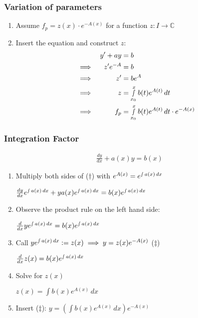 \documentclass[a4paper, 10pt]{article}
\theoremstyle{definition}
\theoremstyle{colored}
\theoremstyle{ex}
\theoremstyle{named}
\newcommand{\C}{\mathbb{C}}
\begin{document}
\subsubsection*{Variation of parameters}
\begin{enumerate}
    \item Assume \(f_p = z(x) \cdot e^{-A(x)}\) for a function \(z: I \to \C\)
    \item Insert the equation and construct \(z\):
    \begin{align*}
        &&y' + ay &= b \\
        &\implies& z'e^{-A} &= b \\
        &\implies& z' &= be^{A} \\
        &\implies& z &= \smallint_{x_0}^x b(t)e^{A(t)}\,dt \\
        &\implies& f_p &= \smallint_{x_0}^x b(t) e^{A(t)}\,dt \cdot e^{-A(x)}
    \end{align*}
\end{enumerate}

\subsubsection*{Integration Factor}
\begin{align}
    \tag{\(\dagger\)} \frac{dy}{dx} + a(x) y = b(x)
\end{align}
\begin{enumerate}
    \item Multiply both sides of (\(\dagger\)) with \(e^{A(x)} = e^{\smallint a(x)\,dx}\) \par
    \centering
    \(\frac{dy}{dx} e^{\smallint a(x)\,dx} + ya(x)e^{\smallint a(x)\,dx} = b(x)e^{\smallint a(x)\,dx}\)
    \item \raggedright Observe the product rule on the left hand side: \par
    \centering
    \(\frac{d}{dx}ye^{\smallint a(x)\,dx} = b(x)e^{\smallint a(x)\,dx}\)
    \item \raggedright Call \(y e^{\smallint a(x)\,dx}:=z(x) \implies y = z(x)e^{-A(x)}\) (\(\ddagger\)) \par
    \centering
    \(\frac{d}{dx}z(x) = b(x)e^{\smallint a(x)\,dx}\)
    \item \raggedright Solve for \(z(x)\) \par
    \centering
    \(z(x) = \int b(x) e^{A(x)}\,dx\)
    \item \raggedright Insert (\(\ddagger\)):
    \(y = \left(\int b(x)e^{A(x)} \,dx\right) e^{-A(x)}\)
\end{enumerate}
\end{document}

